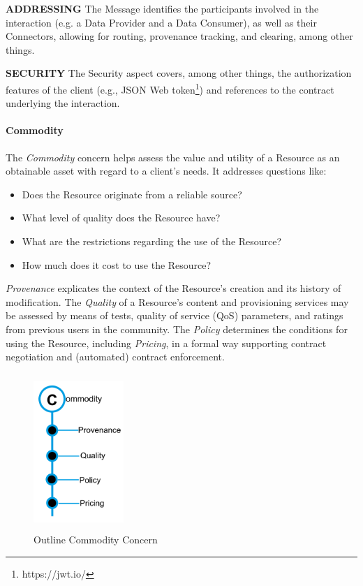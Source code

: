 

\textbf{ADDRESSING }The Message identifies the participants involved in the interaction (e.g. a Data Provider and a Data Consumer), as well as their Connectors, allowing for routing, provenance tracking, and clearing, among other things.

\textbf{SECURITY} The Security aspect covers, among other things, the authorization features of the client (e.g., JSON Web token\footnote{https://jwt.io/ }) and references to the contract underlying the interaction. 

\paragraph{Commodity\\}


The \textit{Commodity} concern helps assess the value and utility of a Resource as an obtainable asset with regard to a client’s needs. It addresses questions like:
 \begin{itemize}
	\item Does the Resource originate from a reliable source? 
 	\item What level of quality does the Resource have? 
 	\item What are the restrictions regarding the use of the Resource? 
 	\item How much does it cost to use the Resource?
\end{itemize} 
 \textit{Provenance} explicates the context of the Resource’s creation and its history of modification. The \textit{Quality} of a Resource’s content and provisioning services may be assessed by means of tests, quality of service (QoS) parameters, and ratings from previous users in the community. The \textit{Policy }determines the conditions for using the Resource, including \textit{Pricing}, in a formal way supporting contract negotiation and (automated) contract enforcement. 

\begin{figure}[H]
	\begin{Center}
		\includegraphics[width=1.34in,height=2.33in]{./media/image43.png}
		\caption{Outline Commodity Concern}
		\label{fig:outline_commodity_concern}
	\end{Center}
\end{figure}



